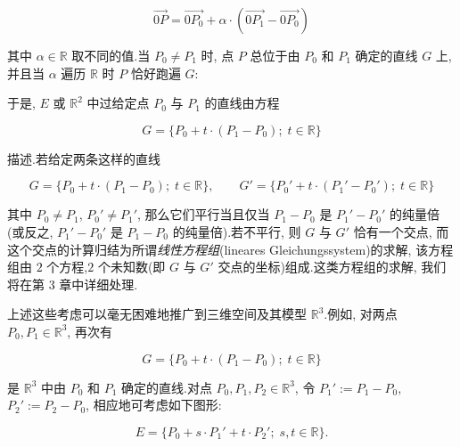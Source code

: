 \[
\overrightarrow{0P} = \overrightarrow{0P_0} + \alpha \cdot (\overrightarrow{0P_1} - \overrightarrow{0P_0})
\]

其中 $\alpha \in \mathbb{R}$ 取不同的值.当 $P_0 \neq P_1$ 时, 点 $P$ 总位于由 $P_0$ 和 $P_1$ 确定的直线 $G$ 上, 并且当 $\alpha$ 遍历 $\mathbb{R}$ 时 $P$ 恰好跑遍 $G$:

\begin{center}
\end{center}

于是, $E$ 或 $\mathbb{R}^2$ 中过给定点 $P_0$ 与 $P_1$ 的直线由方程

\[
G = \{P_0 + t \cdot (P_1 - P_0);\; t \in \mathbb{R}\}
\]

描述.若给定两条这样的直线

\[
G = \{P_0 + t \cdot (P_1 - P_0);\; t \in \mathbb{R}\}, \qquad
G' = \{P_0' + t \cdot (P_1' - P_0');\; t \in \mathbb{R}\}
\]

其中 $P_0 \neq P_1$, $P_0' \neq P_1'$, 那么它们平行当且仅当 $P_1 - P_0$ 是 $P_1' - P_0'$ 的纯量倍(或反之, $P_1' - P_0'$ 是 $P_1 - P_0$ 的纯量倍).若不平行, 则 $G$ 与 $G'$ 恰有一个交点, 而这个交点的计算归结为所谓\emph{线性方程组}(\textup{lineares Gleichungssystem})的求解, 该方程组由 $2$ 个方程,$2$ 个未知数(即 $G$ 与 $G'$ 交点的坐标)组成.这类方程组的求解, 我们将在第 3 章中详细处理.

上述这些考虑可以毫无困难地推广到三维空间及其模型 $\mathbb{R}^3$.例如, 对两点 $P_0, P_1 \in \mathbb{R}^3$, 再次有

\[
G = \{P_0 + t \cdot (P_1 - P_0);\; t \in \mathbb{R}\}
\]

是 $\mathbb{R}^3$ 中由 $P_0$ 和 $P_1$ 确定的直线.对点 $P_0, P_1, P_2 \in \mathbb{R}^3$, 令 $P_1' := P_1 - P_0$, $P_2' := P_2 - P_0$, 相应地可考虑如下图形:

\[
E = \{P_0 + s \cdot P_1' + t \cdot P_2';\; s, t \in \mathbb{R}\}.
\]

